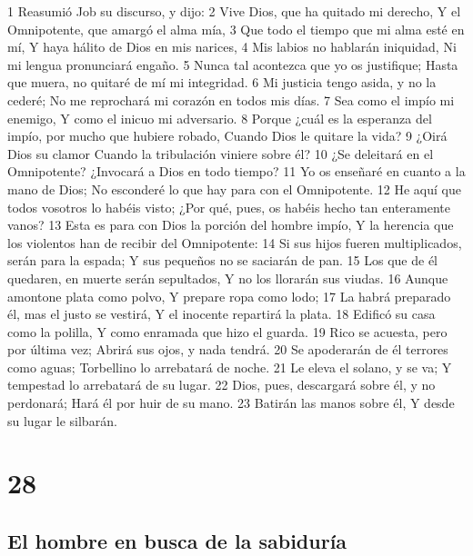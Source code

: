 1 Reasumió Job su discurso, y dijo:
2 Vive Dios, que ha quitado mi derecho,
Y el Omnipotente, que amargó el alma mía,
3 Que todo el tiempo que mi alma esté en mí,
Y haya hálito de Dios en mis narices,
4 Mis labios no hablarán iniquidad,
Ni mi lengua pronunciará engaño.
5 Nunca tal acontezca que yo os justifique;
Hasta que muera, no quitaré de mí mi integridad.
6 Mi justicia tengo asida, y no la cederé;
No me reprochará mi corazón en todos mis días.
7 Sea como el impío mi enemigo,
Y como el inicuo mi adversario.
8 Porque ¿cuál es la esperanza del impío, por mucho que hubiere robado,
Cuando Dios le quitare la vida?
9 ¿Oirá Dios su clamor
Cuando la tribulación viniere sobre él?
10 ¿Se deleitará en el Omnipotente?
¿Invocará a Dios en todo tiempo?
11 Yo os enseñaré en cuanto a la mano de Dios;
No esconderé lo que hay para con el Omnipotente.
12 He aquí que todos vosotros lo habéis visto;
¿Por qué, pues, os habéis hecho tan enteramente vanos?
13 Esta es para con Dios la porción del hombre impío,
Y la herencia que los violentos han de recibir del Omnipotente:
14 Si sus hijos fueren multiplicados, serán para la espada;
Y sus pequeños no se saciarán de pan.
15 Los que de él quedaren, en muerte serán sepultados,
Y no los llorarán sus viudas.
16 Aunque amontone plata como polvo,
Y prepare ropa como lodo;
17 La habrá preparado él, mas el justo se vestirá,
Y el inocente repartirá la plata.
18 Edificó su casa como la polilla,
Y como enramada que hizo el guarda.
19 Rico se acuesta, pero por última vez;
Abrirá sus ojos, y nada tendrá.
20 Se apoderarán de él terrores como aguas;
Torbellino lo arrebatará de noche.
21 Le eleva el solano, y se va;
Y tempestad lo arrebatará de su lugar.
22 Dios, pues, descargará sobre él, y no perdonará;
Hará él por huir de su mano.
23 Batirán las manos sobre él,
Y desde su lugar le silbarán.

\chapter{28}

\section*{El hombre en busca de la sabiduría}

